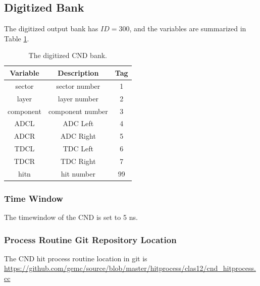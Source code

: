 \subsection{Digitized Bank}
The digitized output bank has $ID=300$, and the variables are summarized in Table \ref{tab:cndBank}.

\begin{table}[h]
	\begin{center}
		\begin{tabular}{| c | c | c |}
			\hline \hline
			Variable         & Description  & Tag  \\
			\hline
              sector  &                                     sector number  &    1   \\
               layer  &                                      layer number  &    2   \\
           component  &                                  component number  &    3   \\
                ADCL  &                                          ADC Left  &    4   \\
                ADCR  &                                         ADC Right  &    5   \\
                TDCL  &                                          TDC Left  &    6   \\
                TDCR  &                                         TDC Right  &    7   \\
                hitn  &                                        hit number  &   99   \\
			\hline \hline
		\end{tabular}
	\end{center}
	\caption{The digitized CND bank.}\label{tab:cndBank}
\end{table}


\subsubsection{Time Window}
The timewindow of the CND is set to 5 ns.


\subsubsection{Process Routine Git Repository Location}
The CND hit process routine location in git is \url{https://github.com/gemc/source/blob/master/hitprocess/clas12/cnd_hitprocess.cc}
